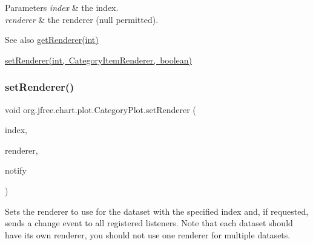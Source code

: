 \begin{DoxyParams}{Parameters}
{\em index} & the index. \\
\hline
{\em renderer} & the renderer ({\ttfamily null} permitted).\\
\hline
\end{DoxyParams}
\begin{DoxySeeAlso}{See also}
\mbox{\hyperlink{classorg_1_1jfree_1_1chart_1_1plot_1_1_category_plot_abf90ab29e7c3ddb968f7668e0f697725}{get\+Renderer(int)}} 

\mbox{\hyperlink{classorg_1_1jfree_1_1chart_1_1plot_1_1_category_plot_abae8165af07c1a9594374eb1da6c8e56}{set\+Renderer(int, Category\+Item\+Renderer, boolean)}} 
\end{DoxySeeAlso}
\mbox{\label{classorg_1_1jfree_1_1chart_1_1plot_1_1_category_plot_abae8165af07c1a9594374eb1da6c8e56}} 
\subsubsection{\texorpdfstring{set\+Renderer()}{setRenderer()}\hspace{0.1cm}{\footnotesize\ttfamily [4/4]}}
{\footnotesize\ttfamily void org.\+jfree.\+chart.\+plot.\+Category\+Plot.\+set\+Renderer (\begin{DoxyParamCaption}\item[{int}]{index,  }\item[{\mbox{\hyperlink{interfaceorg_1_1jfree_1_1chart_1_1renderer_1_1category_1_1_category_item_renderer}{Category\+Item\+Renderer}}}]{renderer,  }\item[{boolean}]{notify }\end{DoxyParamCaption})}

Sets the renderer to use for the dataset with the specified index and, if requested, sends a change event to all registered listeners. Note that each dataset should have its own renderer, you should not use one renderer for multiple datasets.


